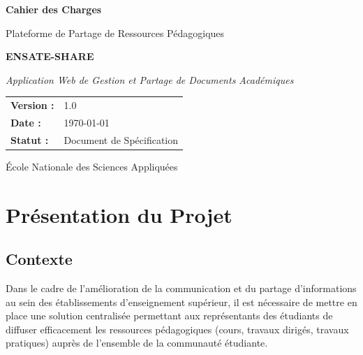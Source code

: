 \documentclass[12pt,a4paper]{article}
\begin{document}
\begin{titlepage}
    \centering
    \vspace*{2cm}
    
    {\Huge\bfseries Cahier des Charges\par}
    \vspace{0.5cm}
    {\LARGE Plateforme de Partage de Ressources Pédagogiques\par}
    \vspace{0.3cm}
    {\Large\textbf{ENSATE-SHARE}\par}
    
    \vspace{2cm}
    
    {\large\textit{Application Web de Gestion et Partage de Documents Académiques}\par}
    
    \vspace{3cm}
    
    \begin{tabular}{ll}
        \textbf{Version :} & 1.0 \\
        \textbf{Date :} & \today \\
        \textbf{Statut :} & Document de Spécification \\
    \end{tabular}
    
    \vfill
    
    {\large École Nationale des Sciences Appliquées\par}
    
\end{titlepage}

\tableofcontents
\newpage

\section{Présentation du Projet}

\subsection{Contexte}

Dans le cadre de l'amélioration de la communication et du partage d'informations au sein des établissements d'enseignement supérieur, il est nécessaire de mettre en place une solution centralisée permettant aux représentants des étudiants de diffuser efficacement les ressources pédagogiques (cours, travaux dirigés, travaux pratiques) auprès de l'ensemble de la communauté étudiante.
\end{document}
